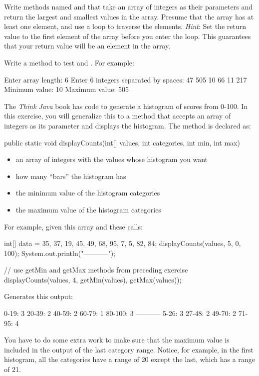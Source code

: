 \begin{exercise}
Write methods named  and  that take an array of integers as their parameters and return the largest and smallest values in the array. Presume that the array has at least one element, and use a loop to traverse the elements.  {\em Hint}: Set the return value to the first element of the array before you enter the loop. This guarantees that your return value will be an element in the array.

Write a  method to test  and . For example:

\begin{stdout}
Enter array length: 6
Enter 6 integers separated by spaces: 47 505 10 66 11 217
Minimum value: 10
Maximum value: 505
\end{stdout}

\end{exercise}

\begin{exercise}
The {\em Think Java} book has code to generate a histogram of scores from 0-100. In this exercise, you will generalize this to a method that accepts an array of integers as its parameter and displays the histogram.  The method is declared as:

\begin{code}
public static void displayCounts(int[] values,
     int categories, int min, int max)
\end{code}

\begin{itemize}
\item {} an array of integers with the values whose histogram you want
\item {} how many ``bars'' the histogram has
\item {} the minimum value of the histogram categories
\item {} the maximum value of the histogram categories
\end{itemize}

For example, given this array and these calls:

\begin{code}
int[] data =  {35, 37, 19, 45, 49, 68, 95, 7, 5, 82, 84};
displayCounts(values, 5, 0, 100);
System.out.println("-----------");

// use getMin and getMax methods from preceding exercise
displayCounts(values, 4, getMin(values), getMax(values));
\end{code}

Generates this output:

\begin{stdout}
0-19: 3
20-39: 2
40-59: 2
60-79: 1
80-100: 3
-----------
5-26: 3
27-48: 2
49-70: 2
71-95: 4
\end{stdout}

You have to do some extra work to make sure that the maximum value is included in the output of the last category range. Notice, for example, in the first histogram, all the categories have a range of 20 except the last, which has a range of 21.
\end{exercise}

